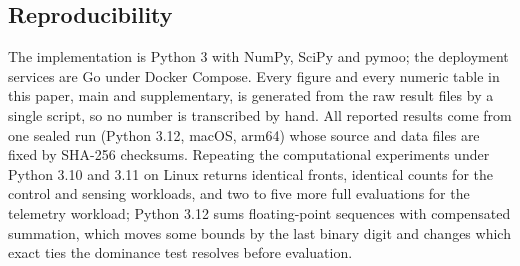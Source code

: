 \subsection{Reproducibility}
The implementation is Python 3 with NumPy, SciPy and pymoo; the deployment services are
Go under Docker Compose. Every figure and every numeric table in this paper, main and
supplementary, is generated from the raw result files by a single script, so no number is
transcribed by hand. All reported results come from one sealed run (Python 3.12, macOS,
arm64) whose source and data files are fixed by SHA-256 checksums. Repeating the
computational experiments under Python 3.10 and 3.11 on Linux returns identical fronts,
identical counts for the control and sensing workloads, and two to five more full
evaluations for the telemetry workload; Python 3.12 sums floating-point sequences with
compensated summation, which moves some bounds by the last binary digit and changes
which exact ties the dominance test resolves before evaluation.
